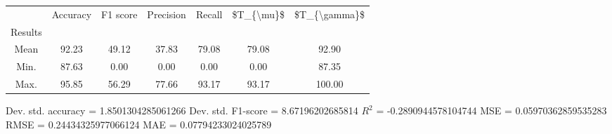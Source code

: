 \begin{tabular}{|c|c|c|c|c|c|c|}
\toprule
{} &  Accuracy &  F1 score &  Precision &  Recall &  \$T\_\{\textbackslash mu\}\$ &  \$T\_\{\textbackslash gamma\}\$ \\
Results &           &           &            &         &            &               \\
\hline
Mean    &     92.23 &     49.12 &      37.83 &   79.08 &      79.08 &         92.90 \\
Min.    &     87.63 &      0.00 &       0.00 &    0.00 &       0.00 &         87.35 \\
Max.    &     95.85 &     56.29 &      77.66 &   93.17 &      93.17 &        100.00 \\
\bottomrule
\end{tabular}

 Dev. std. accuracy = 1.8501304285061266
 Dev. std. F1-score = 8.67196202685814
 $R^2$ = -0.2890944578104744
 MSE = 0.05970362859535283
 RMSE = 0.24434325977066124
 MAE = 0.07794233024025789
